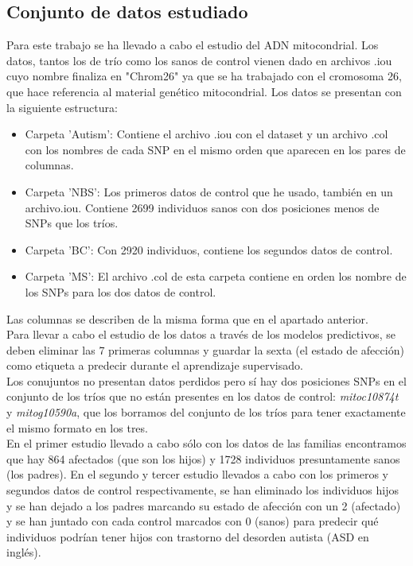 \subsection{Conjunto de datos estudiado}
Para este trabajo se ha llevado a cabo el estudio del ADN mitocondrial. Los datos, tantos los de trío como los sanos de control vienen dado en archivos .iou cuyo nombre finaliza en "Chrom26" ya que se ha trabajado con el cromosoma 26, que hace referencia al material genético mitocondrial. Los datos se presentan con la siguiente estructura:\\
\begin{itemize}
  \item Carpeta 'Autism': Contiene el archivo .iou con el dataset y un archivo .col con los nombres de cada SNP en el mismo orden que aparecen en los pares de columnas.
  \item Carpeta 'NBS': Los primeros datos de control que he usado, también en un archivo.iou. Contiene 2699 individuos sanos con dos posiciones menos de SNPs que los tríos.
  \item Carpeta 'BC': Con 2920 individuos, contiene los segundos datos de control.
  \item Carpeta 'MS': El archivo .col de esta carpeta contiene en orden los nombre de los SNPs para los dos datos de control.
\end{itemize}
Las columnas se describen de la misma forma que en el apartado anterior.\\
Para llevar a cabo el estudio de los datos a través de los modelos predictivos, se deben eliminar las 7 primeras columnas y guardar la sexta (el estado de afección) como etiqueta a predecir durante el aprendizaje supervisado.\\
Los conujuntos no presentan datos perdidos pero sí hay dos posiciones SNPs en el conjunto de los tríos que no están presentes en los datos de control: \textit{mitoc10874t} y \textit{mitog10590a}, que los borramos del conjunto de los tríos para tener exactamente el mismo formato en los tres.\\
En el primer estudio llevado a cabo sólo con los datos de las familias encontramos que hay 864 afectados (que son los hijos) y 1728 individuos presuntamente sanos (los padres). En el segundo y tercer estudio llevados a cabo con los primeros y segundos datos de control respectivamente, se han eliminado los individuos hijos y se han dejado a los padres marcando su estado de afección con un 2 (afectado) y se han juntado con cada control marcados con 0 (sanos) para predecir qué individuos podrían tener hijos con trastorno del desorden autista (ASD en inglés).
\endinput

%
%
%
%
%
%
%
%
%
%
%
%
%
%
%
%







